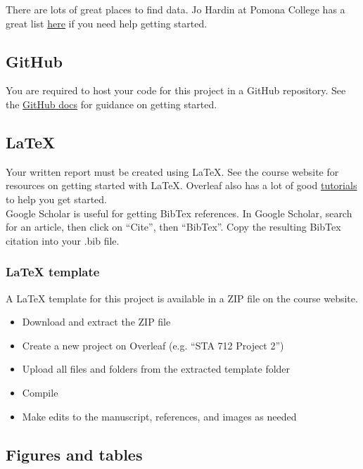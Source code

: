 \documentclass[11pt]{article}
\begin{document}
There are lots of great places to find data. Jo Hardin at Pomona College has a great list \href{https://hardin47.netlify.app/courses/data/}{here} if you need help getting started.

\subsection*{GitHub}

You are required to host your code for this project in a GitHub repository. See the \href{https://docs.github.com/en/get-started/quickstart/hello-world}{GitHub docs} for guidance on getting started.

\subsection*{LaTeX}

Your written report must be created using LaTeX. See the course website for resources on getting started with LaTeX. Overleaf also has a lot of good \href{https://www.overleaf.com/learn/latex/Tutorials}{tutorials} to help you get started.\\

\noindent Google Scholar is useful for getting BibTex references. In Google Scholar, search for an article, then click on ``Cite'', then ``BibTex''. Copy the resulting BibTex citation into your .bib file.

\subsubsection*{LaTeX template}

A LaTeX template for this project is available in a ZIP file on the course website.

\begin{itemize}
\item Download and extract the ZIP file
\item Create a new project on Overleaf (e.g. ``STA 712 Project 2'')
\item Upload all files and folders from the extracted template folder
\item Compile
\item Make edits to the manuscript, references, and images as needed
\end{itemize}

\subsection*{Figures and tables}
\end{document}
